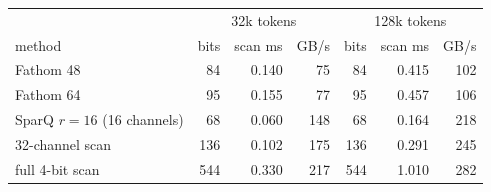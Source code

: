 \begin{tabular}{lrrrrrr}
\toprule
 & \multicolumn{3}{c}{32k tokens} & \multicolumn{3}{c}{128k tokens} \\
method & bits & scan ms & GB/s & bits & scan ms & GB/s \\
\midrule
Fathom 48 & 84 & 0.140 & 75 & 84 & 0.415 & 102 \\
Fathom 64 & 95 & 0.155 & 77 & 95 & 0.457 & 106 \\
SparQ $r{=}16$ (16 channels) & 68 & 0.060 & 148 & 68 & 0.164 & 218 \\
32-channel scan & 136 & 0.102 & 175 & 136 & 0.291 & 245 \\
full 4-bit scan & 544 & 0.330 & 217 & 544 & 1.010 & 282 \\
\bottomrule
\end{tabular}